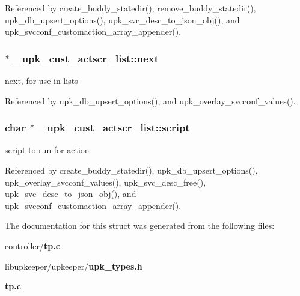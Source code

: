 Referenced by create\_\-buddy\_\-statedir(), remove\_\-buddy\_\-statedir(), upk\_\-db\_\-upsert\_\-options(), upk\_\-svc\_\-desc\_\-to\_\-json\_\-obj(), and upk\_\-svcconf\_\-customaction\_\-array\_\-appender().

\subsubsection[{next}]{ $\ast$ {\bf \_\-upk\_\-cust\_\-actscr\_\-list::next}}\label{struct__upk__cust__actscr__list_a3753ce5ee3adb3d45a4c7ac08c11b0fe}
next, for use in lists 

Referenced by upk\_\-db\_\-upsert\_\-options(), and upk\_\-overlay\_\-svcconf\_\-values().

\subsubsection[{script}]{\setlength{\rightskip}{0pt plus 5cm}char $\ast$ {\bf \_\-upk\_\-cust\_\-actscr\_\-list::script}}\label{struct__upk__cust__actscr__list_a17dda5e10abdca8f72f8ed2427d4b5e4}
script to run for action 

Referenced by create\_\-buddy\_\-statedir(), upk\_\-db\_\-upsert\_\-options(), upk\_\-overlay\_\-svcconf\_\-values(), upk\_\-svc\_\-desc\_\-free(), upk\_\-svc\_\-desc\_\-to\_\-json\_\-obj(), and upk\_\-svcconf\_\-customaction\_\-array\_\-appender().



The documentation for this struct was generated from the following files:\begin{DoxyCompactItemize}
\item 
controller/{\bf tp.c}\item 
libupkeeper/upkeeper/{\bf upk\_\-types.h}\item 
{\bf tp.c}\end{DoxyCompactItemize}
